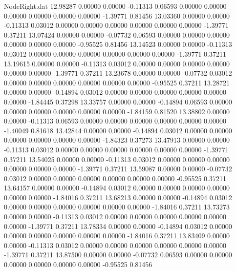 \begin{filecontents}{NodeRight.dat}
  12.98287    0.00000    0.00000    -0.11313    0.06593    0.00000    0.00000    0.00000    0.00000    0.00000    0.00000   -1.39771    0.81456
  13.03360    0.00000    0.00000    -0.11313    0.03012    0.00000    0.00000    0.00000    0.00000    0.00000    0.00000   -1.39771    0.37211
  13.07424    0.00000    0.00000    -0.07732    0.06593    0.00000    0.00000    0.00000    0.00000    0.00000    0.00000   -0.95525    0.81456
  13.14523    0.00000    0.00000    -0.11313    0.03012    0.00000    0.00000    0.00000    0.00000    0.00000    0.00000   -1.39771    0.37211
  13.19615    0.00000    0.00000    -0.11313    0.03012    0.00000    0.00000    0.00000    0.00000    0.00000    0.00000   -1.39771    0.37211
  13.23678    0.00000    0.00000    -0.07732    0.03012    0.00000    0.00000    0.00000    0.00000    0.00000    0.00000   -0.95525    0.37211
  13.28721    0.00000    0.00000    -0.14894    0.03012    0.00000    0.00000    0.00000    0.00000    0.00000    0.00000   -1.84445    0.37298
  13.33757    0.00000    0.00000    -0.14894    0.06593    0.00000    0.00000    0.00000    0.00000    0.00000    0.00000   -1.84159    0.81520
  13.38802    0.00000    0.00000    -0.11313    0.06593    0.00000    0.00000    0.00000    0.00000    0.00000    0.00000   -1.40049    0.81618
  13.42844    0.00000    0.00000    -0.14894    0.03012    0.00000    0.00000    0.00000    0.00000    0.00000    0.00000   -1.84323    0.37273
  13.47913    0.00000    0.00000    -0.11313    0.03012    0.00000    0.00000    0.00000    0.00000    0.00000    0.00000   -1.39771    0.37211
  13.54025    0.00000    0.00000    -0.11313    0.03012    0.00000    0.00000    0.00000    0.00000    0.00000    0.00000   -1.39771    0.37211
  13.59087    0.00000    0.00000    -0.07732    0.03012    0.00000    0.00000    0.00000    0.00000    0.00000    0.00000   -0.95525    0.37211
  13.64157    0.00000    0.00000    -0.14894    0.03012    0.00000    0.00000    0.00000    0.00000    0.00000    0.00000   -1.84016    0.37211
  13.68213    0.00000    0.00000    -0.14894    0.03012    0.00000    0.00000    0.00000    0.00000    0.00000    0.00000   -1.84016    0.37211
  13.73273    0.00000    0.00000    -0.11313    0.03012    0.00000    0.00000    0.00000    0.00000    0.00000    0.00000   -1.39771    0.37211
  13.78334    0.00000    0.00000    -0.14894    0.03012    0.00000    0.00000    0.00000    0.00000    0.00000    0.00000   -1.84016    0.37211
  13.83409    0.00000    0.00000    -0.11313    0.03012    0.00000    0.00000    0.00000    0.00000    0.00000    0.00000   -1.39771    0.37211
  13.87500    0.00000    0.00000    -0.07732    0.06593    0.00000    0.00000    0.00000    0.00000    0.00000    0.00000   -0.95525    0.81456

\end{filecontents}
